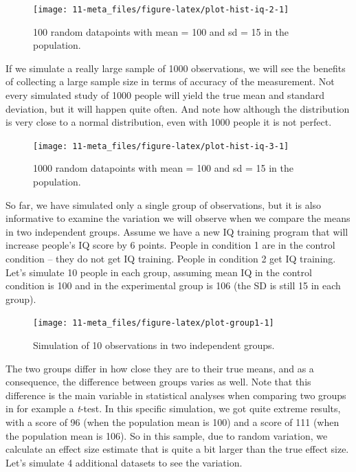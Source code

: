 \documentclass[
  oneside]{krantz}
\begin{document}
\begin{figure}

{\centering \texttt{[image: 11-meta\_files/figure-latex/plot-hist-iq-2-1]} 

}

\caption{100 random datapoints with mean = 100 and sd = 15 in the population.}\label{fig:plot-hist-iq-2}
\end{figure}

If we simulate a really large sample of 1000 observations, we will see the benefits of collecting a large sample size in terms of accuracy of the measurement. Not every simulated study of 1000 people will yield the true mean and standard deviation, but it will happen quite often. And note how although the distribution is very close to a normal distribution, even with 1000 people it is not perfect.



\begin{figure}

{\centering \texttt{[image: 11-meta\_files/figure-latex/plot-hist-iq-3-1]} 

}

\caption{1000 random datapoints with mean = 100 and sd = 15 in the population.}\label{fig:plot-hist-iq-3}
\end{figure}

So far, we have simulated only a single group of observations, but it is also informative to examine the variation we will observe when we compare the means in two independent groups. Assume we have a new IQ training program that will increase people's IQ score by 6 points. People in condition 1 are in the control condition -- they do not get IQ training. People in condition 2 get IQ training. Let's simulate 10 people in each group, assuming mean IQ in the control condition is 100 and in the experimental group is 106 (the SD is still 15 in each group).



\begin{figure}

{\centering \texttt{[image: 11-meta\_files/figure-latex/plot-group1-1]} 

}

\caption{Simulation of 10 observations in two independent groups.}\label{fig:plot-group1}
\end{figure}

The two groups differ in how close they are to their true means, and as a consequence, the difference between groups varies as well. Note that this difference is the main variable in statistical analyses when comparing two groups in for example a \emph{t}-test. In this specific simulation, we got quite extreme results, with a score of 96 (when the population mean is 100) and a score of 111 (when the population mean is 106). So in this sample, due to random variation, we calculate an effect size estimate that is quite a bit larger than the true effect size. Let's simulate 4 additional datasets to see the variation.
\end{document}
